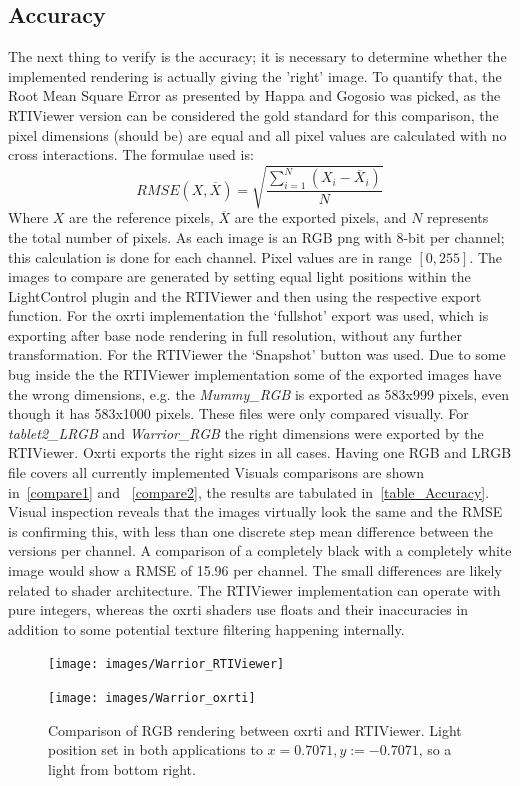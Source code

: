 \subsection{Accuracy}
The next thing to verify is the accuracy; it is necessary to determine whether
the implemented rendering is actually giving the 'right' image. To quantify that, the Root Mean Square Error as presented
by Happa and Gogosio\cite*{gogioso_pbr:_2017} was picked, as the RTIViewer
version can be considered the gold standard for this comparison, the pixel dimensions
(should be) are equal and all pixel values are calculated with no cross
interactions. The formulae used is:
$$RMSE(X, \overline X )= \sqrt{\frac{\sum_{i=1}^{N} (X_{i}-\overline
    X_{i})}{N}}$$
Where $X$ are the reference pixels, $\overline X$ are the exported pixels, and
$N$ represents the total number of pixels. As each image is an RGB png with
8-bit per channel; this calculation is done for each channel. Pixel values are
in range $[0, 255]$. The images to compare are generated by setting equal light
positions within the LightControl plugin and the RTIViewer and then using the
respective export function. For the oxrti implementation the `fullshot' export
was used, which is exporting after base node rendering in full resolution,
without any further transformation. For the RTIViewer the `Snapshot' button was
used. Due to some bug inside the the RTIViewer implementation some of the
exported images have the wrong dimensions, e.g. the \emph{Mummy\_RGB} is exported
as 583x999 pixels, even though it has 583x1000 pixels. These files were only
compared visually. For \emph{tablet2\_LRGB} and \emph{Warrior\_RGB} the right
dimensions were exported by the RTIViewer. Oxrti exports the right sizes in all
cases. Having one RGB and LRGB file covers all currently implemented  Visuals
comparisons are shown in~\autoref{compare1} and ~\autoref{compare2}, the results
are tabulated in~\autoref{table_Accuracy}. Visual inspection reveals that the
images virtually look the same and the RMSE is confirming this, with less than
one discrete step mean difference between the versions per channel. A
comparison of a completely black with a completely white image would show a RMSE
of 15.96 per channel. The small differences are likely related to shader
architecture. The RTIViewer implementation can operate with pure integers,
whereas the oxrti shaders use floats and their inaccuracies in addition to some
potential texture filtering happening internally.

\begin{figure}
\begin{subfloat}{\texttt{[image: images/Warrior\_RTIViewer]}}\end{subfloat}
\begin{subfloat}{\texttt{[image: images/Warrior\_oxrti]}}\end{subfloat}
\caption[Warrior Comparison]{Comparison of RGB rendering between oxrti and RTIViewer. Light position
set in both applications to $x=0.7071, y:=-0.7071$, so a light from bottom right.}
\label{compare1}
\end{figure}

